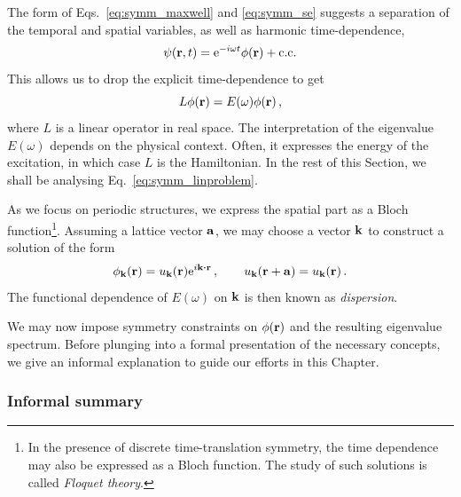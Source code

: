The form of Eqs.~\eqref{eq:symm_maxwell} and \eqref{eq:symm_se} suggests a separation of the temporal and spatial variables, as well as harmonic time-dependence,
%
\begin{equation} \label{eq:symm_sol_gen}
\psi(\vb{r}, t) = {\rm e}^{-i \omega t} \phi(\vb{r}) + \text{c.c.} 
\end{equation}
%
This allows us to drop the explicit time-dependence to get
\begin{equation} \label{eq:symm_linproblem}
L \phi(\vb{r}) = E(\omega) \phi(\vb{r})\,,
\end{equation}
where $L$ is a linear operator in real space. The interpretation of the eigenvalue $E(\omega)$ depends on the physical context. Often, it expresses the energy of the excitation, in which case $L$ is the Hamiltonian. In the rest of this Section, we shall be analysing Eq.~\eqref{eq:symm_linproblem}.

As we focus on periodic structures, we express the spatial part as a Bloch function\footnote{In the presence of discrete time-translation symmetry, the time dependence may also be expressed as a Bloch function. The study of such solutions is called \textit{Floquet theory}.}. Assuming a lattice vector $\vb{a}$, we may choose a vector $\vb{k}$ to construct a solution of the form
\begin{equation} \label{eq:symm_sol_gen_space}
\phi_{\vb{k}}(\vb{r}) = u_{\vb{k}}(\vb{r}) \e^{i \vb{k} \vdot \vb{r}} \,, \qquad u_{\vb{k}}(\vb{r} + \vb{a}) = u_{\vb{k}}(\vb{r}) \,.
\end{equation}
The functional dependence of $E(\omega)$ on $\vb{k}$ is then known as \textit{dispersion}.

We may now impose symmetry constraints on $\phi(\vb{r})$ and the resulting eigenvalue spectrum. Before plunging into a formal presentation of the necessary concepts, we give an informal explanation to guide our efforts in this Chapter. 

\subsubsection{Informal summary} 

